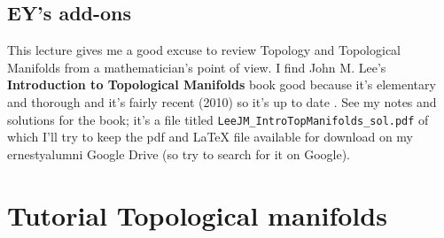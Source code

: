 \documentclass[10pt]{amsart}
\begin{document}
\begin{multicols*}{2}
\subsection*{EY's add-ons}

This lecture gives me a good excuse to review Topology and Topological Manifolds from a mathematician's point of view.  I find John M. Lee's \textbf{Introduction to Topological Manifolds} book good because it's elementary and thorough and it's fairly recent (2010) so it's up to date \cite{JMLee2010}.  See my notes and solutions for the book; it's a file titled \verb|LeeJM_IntroTopManifolds_sol.pdf| of which I'll try to keep the pdf and LaTeX file available for download on my ernestyalumni Google Drive (so try to search for it on Google).  





\section*{Tutorial Topological manifolds}


\end{multicols*}
\end{document}
